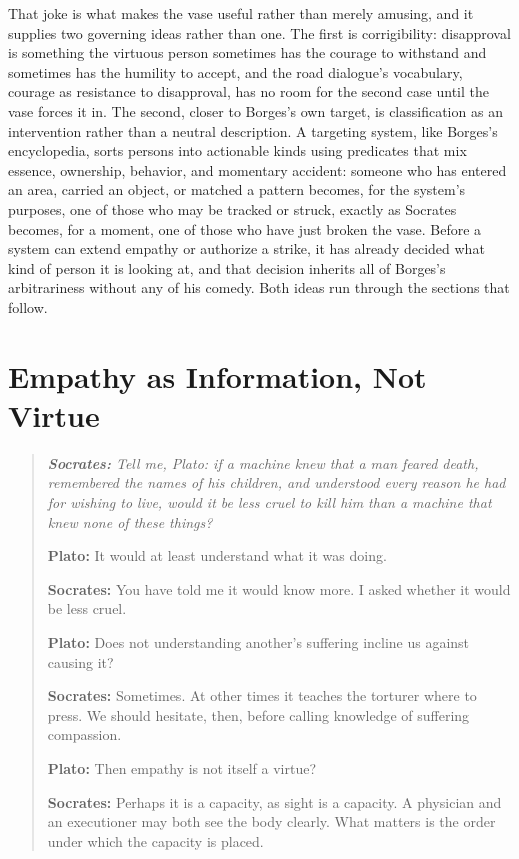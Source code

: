 \documentclass[11pt]{article}
\newenvironment{dialogue}{\begin{quote}\itshape}{\end{quote}}
\newcommand{\says}[2]{\textbf{#1:} #2\par\smallskip}
\begin{document}
That joke is what makes the vase useful rather than merely amusing, and it supplies two governing ideas rather than one. The first is corrigibility: disapproval is something the virtuous person sometimes has the courage to withstand and sometimes has the humility to accept, and the road dialogue's vocabulary, courage as resistance to disapproval, has no room for the second case until the vase forces it in. The second, closer to Borges's own target, is classification as an intervention rather than a neutral description. A targeting system, like Borges's encyclopedia, sorts persons into actionable kinds using predicates that mix essence, ownership, behavior, and momentary accident: someone who has entered an area, carried an object, or matched a pattern becomes, for the system's purposes, one of those who may be tracked or struck, exactly as Socrates becomes, for a moment, one of those who have just broken the vase. Before a system can extend empathy or authorize a strike, it has already decided what kind of person it is looking at, and that decision inherits all of Borges's arbitrariness without any of his comedy. Both ideas run through the sections that follow.

\section{Empathy as Information, Not Virtue}

\begin{dialogue}
\says{Socrates}{Tell me, Plato: if a machine knew that a man feared death, remembered the names of his children, and understood every reason he had for wishing to live, would it be less cruel to kill him than a machine that knew none of these things?}
\says{Plato}{It would at least understand what it was doing.}
\says{Socrates}{You have told me it would know more. I asked whether it would be less cruel.}
\says{Plato}{Does not understanding another's suffering incline us against causing it?}
\says{Socrates}{Sometimes. At other times it teaches the torturer where to press. We should hesitate, then, before calling knowledge of suffering compassion.}
\says{Plato}{Then empathy is not itself a virtue?}
\says{Socrates}{Perhaps it is a capacity, as sight is a capacity. A physician and an executioner may both see the body clearly. What matters is the order under which the capacity is placed.}
\end{dialogue}
\end{document}
